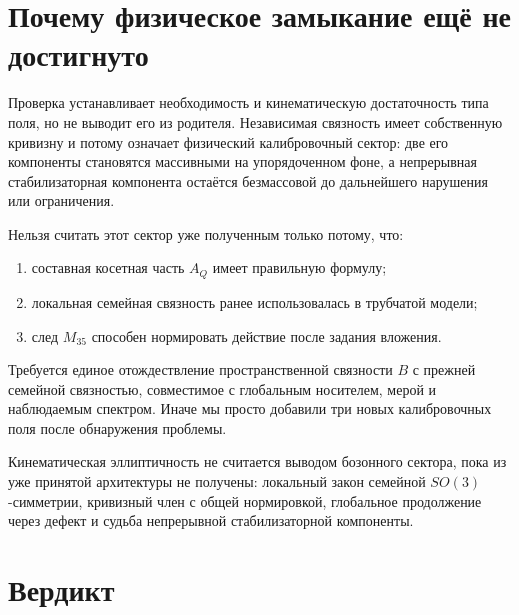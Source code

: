 \section{Почему физическое замыкание ещё не достигнуто}

Проверка устанавливает необходимость и кинематическую достаточность типа
поля, но не выводит его из родителя. Независимая связность имеет
собственную кривизну и потому означает физический калибровочный сектор:
две его компоненты становятся массивными на упорядоченном фоне, а
непрерывная стабилизаторная компонента остаётся безмассовой до дальнейшего
нарушения или ограничения.

Нельзя считать этот сектор уже полученным только потому, что:
\begin{enumerate}
 \item составная косетная часть $A_Q$ имеет правильную формулу;
 \item локальная семейная связность ранее использовалась в трубчатой
 модели;
 \item след $M_{35}$ способен нормировать действие после задания
 вложения.
\end{enumerate}
Требуется единое отождествление пространственной связности $B$ с прежней
семейной связностью, совместимое с глобальным носителем, мерой и
наблюдаемым спектром. Иначе мы просто добавили три новых калибровочных
поля после обнаружения проблемы.

\begin{nogocriterion}
Кинематическая эллиптичность не считается выводом бозонного сектора, пока
из уже принятой архитектуры не получены: локальный закон семейной
$SO(3)$-симметрии, кривизный член с общей нормировкой, глобальное
продолжение через дефект и судьба непрерывной стабилизаторной компоненты.
\end{nogocriterion}

\section{Вердикт}

